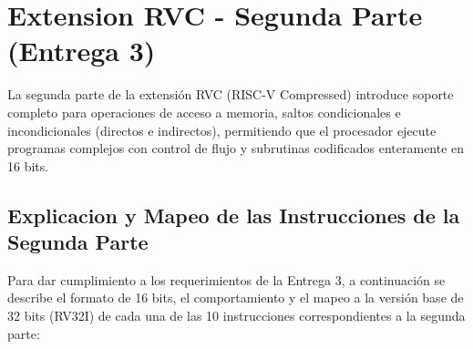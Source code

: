 \documentclass[12pt, a4paper]{article}
\begin{document}
\section{Extension RVC - Segunda Parte (Entrega 3)}
La segunda parte de la extensión RVC (RISC-V Compressed) introduce soporte completo para operaciones de acceso a memoria, saltos condicionales e incondicionales (directos e indirectos), permitiendo que el procesador ejecute programas complejos con control de flujo y subrutinas codificados enteramente en 16 bits.

\subsection{Explicacion y Mapeo de las Instrucciones de la Segunda Parte}
Para dar cumplimiento a los requerimientos de la Entrega 3, a continuación se describe el formato de 16 bits, el comportamiento y el mapeo a la versión base de 32 bits (RV32I) de cada una de las 10 instrucciones correspondientes a la segunda parte:
\end{document}
